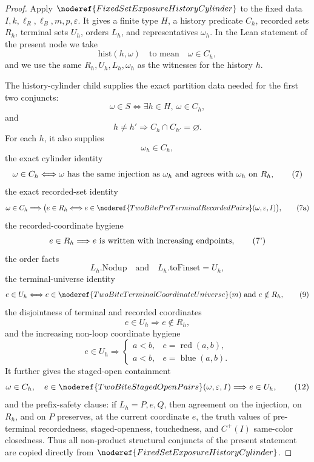 \begin{proof}
Apply \(\noderef{FixedSetExposureHistoryCylinder}\) to the fixed data
\(I,k,\ell_R,\ell_B,m,p,\varepsilon\).  It gives a finite type \(H\), a
history predicate \(C_h\), recorded sets \(R_h\), terminal sets \(U_h\),
orders \(L_h\), and representatives \(\omega_h\).  In the Lean statement of
the present node we take
\[
\mathrm{hist}(h,\omega)\quad\text{to mean}\quad \omega\in C_h,
\]
and we use the same \(R_h,U_h,L_h,\omega_h\) as the witnesses for the
history \(h\).

The history-cylinder child supplies the exact partition data needed for the
first two conjuncts:
\[
\omega\in S \Longleftrightarrow \exists h\in H,\ \omega\in C_h,
\tag{4}
\]
and
\[
h\ne h'\Longrightarrow C_h\cap C_{h'}=\varnothing. \tag{5}
\]
For each \(h\), it also supplies
\[
\omega_h\in C_h, \tag{6}
\]
the exact cylinder identity
\[
\omega\in C_h
\Longleftrightarrow
\omega\hbox{ has the same injection as }\omega_h
\hbox{ and agrees with }\omega_h\hbox{ on }R_h, \tag{7}
\]
the exact recorded-set identity
\[
\omega\in C_h
\Longrightarrow
\bigl(e\in R_h\Longleftrightarrow
e\in\noderef{TwoBitePreTerminalRecordedPairs}(\omega,\varepsilon,I)\bigr),
\tag{7a}
\]
the recorded-coordinate hygiene
\[
e\in R_h\Longrightarrow e\hbox{ is written with increasing endpoints},
\tag{7'}
\]
the order facts
\[
L_h.\mathrm{Nodup}
\quad\text{and}\quad
L_h.\mathrm{toFinset}=U_h, \tag{8}
\]
the terminal-universe identity
\[
e\in U_h
\Longleftrightarrow
e\in\noderef{TwoBiteTerminalCoordinateUniverse}(m)
\hbox{ and }e\notin R_h, \tag{9}
\]
the disjointness of terminal and recorded coordinates
\[
e\in U_h\Longrightarrow e\notin R_h, \tag{10}
\]
and the increasing non-loop coordinate hygiene
\[
e\in U_h\Longrightarrow
\begin{cases}
a<b,& e=\operatorname{red}(a,b),\\
a<b,& e=\operatorname{blue}(a,b).
\end{cases}
\tag{11}
\]
It further gives the staged-open containment
\[
\omega\in C_h,\quad
e\in\noderef{TwoBiteStagedOpenPairs}(\omega,\varepsilon,I)
\Longrightarrow e\in U_h, \tag{12}
\]
and the prefix-safety clause: if \(L_h=P,e,Q\), then agreement on the
injection, on \(R_h\), and on \(P\) preserves, at the current coordinate
\(e\), the truth values of pre-terminal recordedness, staged-openness,
touchedness, and \(C^+(I)\) same-color closedness.  Thus all non-product
structural conjuncts of the present statement are copied directly from
\(\noderef{FixedSetExposureHistoryCylinder}\).


\end{proof}
